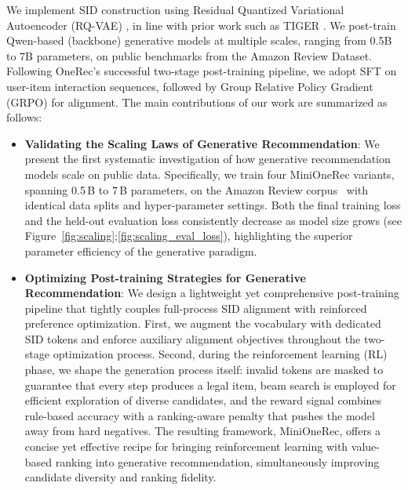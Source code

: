 We implement SID construction using Residual Quantized Variational Autoencoder (RQ-VAE) \citep{rqvae}, in line with prior work such as TIGER \citep{TIGER, OneRec}.
We post-train Qwen-based (backbone) generative models at multiple scales, ranging from 0.5B to 7B parameters, on public benchmarks from the Amazon Review Dataset.
Following OneRec's successful two-stage post-training pipeline, we adopt SFT on user-item interaction sequences, followed by Group Relative Policy Gradient (GRPO) \citep{Deepseek-r1, deepseekmath} for alignment.
The main contributions of our work are summarized as follows:
\begin{itemize}
    \item \textbf{Validating the Scaling Laws of Generative Recommendation}:
    We present the first systematic investigation of how generative recommendation models scale on public data. Specifically, we train four MiniOneRec variants, spanning 0.5\,B to 7\,B parameters, on the Amazon Review corpus~\citep{amazon} with identical data splits and hyper-parameter settings. Both the final training loss and the held-out evaluation loss consistently decrease as model size grows (see Figure~\ref{fig:scaling};\ref{fig:scaling_eval_loss}), highlighting the superior parameter efficiency of the generative paradigm.
    \item \textbf{Optimizing Post-training Strategies for Generative Recommendation}: 
    We design a lightweight yet comprehensive post-training pipeline that tightly couples full-process SID alignment with reinforced preference optimization. First, we augment the vocabulary with dedicated SID tokens and enforce auxiliary alignment objectives throughout the two-stage optimization process. Second, during the reinforcement learning (RL) phase, we shape the generation process itself: invalid tokens are masked to guarantee that every step produces a legal item, beam search is employed for efficient exploration of diverse candidates, and the reward signal combines rule-based accuracy with a ranking-aware penalty that pushes the model away from hard negatives. The resulting framework, MiniOneRec, offers a concise yet effective recipe for bringing reinforcement learning with value-based ranking into generative recommendation, simultaneously improving candidate diversity and ranking fidelity.
\end{itemize}

